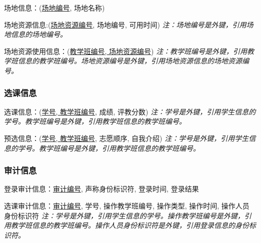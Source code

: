 \textsf{场地信息：}(\uline{场地编号}, 场地名称)

\textsf{场地资源信息:}(\uline{场地资源编号}, 场地编号, 可用时间)
\textsl{注：场地编号是外键，引用场地信息的场地编号。}

\textsf{场地资源使用信息：}(\uline{教学班编号, 场地资源编号})
\textsl{注：教学班编号是外键，引用教学班信息的教学班编号。场地资源编号是外键，引用场地资源信息的场地资源编号。}

\subsubsection{选课信息}
\textsf{选课信息：}(\uline{学号, 教学班编号}, 成绩, 评教分数)
\textsl{注：学号是外键，引用学生信息的学号。教学班编号是外键，引用教学班信息的教学班编号。}

\textsf{预选信息：}(\uline{学号, 教学班编号}, 志愿顺序, 自我介绍)
\textsl{注：学号是外键，引用学生信息的学号。教学班编号是外键，引用教学班信息的教学班编号。}

\subsubsection{审计信息}
\textsf{登录审计信息：}{\uline{审计编号}, 声称身份标识符, 登录时间, 登录结果}

\textsf{选课审计信息：}{\uline{审计编号}, 学号, 操作教学班编号, 操作类型, 操作时间, 操作人员身份标识符}
\textsl{注：学号是外键，引用学生信息的学号。操作教学班编号是外键，引用教学班信息的教学班编号。操作人员身份标识符是外键，引用登录信息的身份标识符。}
